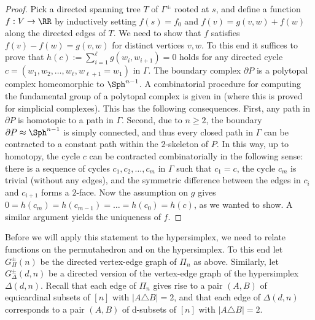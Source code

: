 \begin{proof}
  Pick a directed spanning tree $T$ of $\Gamma^\pm$ rooted at $s$, and define a function $f:V\to\RR$ by inductively setting $f(s)=f_0$ and $f(v) = g(v,w) + f(w)$ along the directed edges of $T$.
  We need to show that $f$ satisfies $f(v)-f(w)=g(v,w)$ for distinct vertices $v,w$.
  To this end it suffices to prove that $h(c):=\sum_{i=1}^{\ell} g(w_i,w_{i+1})=0$ holds for any directed cycle $c=(w_1,w_2,\dots,w_\ell,w_{\ell+1}=w_1)$ in $\Gamma$.
  The boundary complex $\partial P$ is a polytopal complex homeomorphic to $\Sph^{n-1}$.
  A combinatorial procedure for computing the fundamental group of a polytopal complex is given in \cite[\S44]{SeifertThrelfall} (where this is proved for simplicial complexes).
  This has the following consequences.
  First, any path in $\partial P$ is homotopic to a path in $\Gamma$.
  Second, due to $n\geq 2$, the boundary $\partial P \approx \Sph^{n-1}$ is simply connected, and thus every closed path in $\Gamma$ can be contracted to a constant path within the $2$-skeleton of $P$.
  In this way, up to homotopy, the cycle $c$ can be contracted combinatorially in the following sense: there is a sequence of cycles $c_1, c_2, \dots, c_m$ in $\Gamma$ such that $c_1=c$, the cycle  $c_m$ is trivial (without any edges), and the symmetric difference between the edges in $c_i$ and $c_{i+1}$ forms a $2$-face.
  Now the assumption on $g$ gives $0=h(c_m)=h(c_{m-1})=\dots=h(c_0)=h(c)$, as we wanted to show.
  A similar argument yields the uniqueness of $f$.
\end{proof}
Before we will apply this statement to the hypersimplex, we need to relate functions on the permutahedron and on the hypersimplex. 
To this end let $G^\pm_{\Pi}(n)$ be the directed vertex-edge graph of $\Pi_n$ as above.
Similarly, let $G^\pm_\Delta(d,n)$ be a directed version of the vertex-edge graph of the hypersimplex $\Delta(d,n)$.
Recall that each edge of $\Pi_n$ gives rise to a pair $(A,B)$ of equicardinal subsets of $[n]$ with $|A \triangle B| = 2$, and that each edge of $\Delta(d,n)$ corresponds to a pair $(A,B)$ of d-subsets of $[n]$ with $|A \triangle B| = 2$. 

